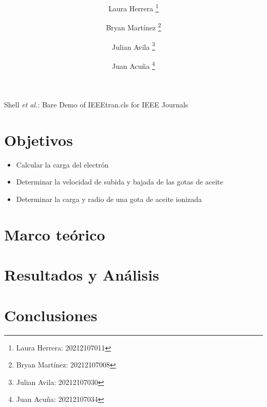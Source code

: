 \documentclass[journal, table]{IEEEtran}
\begin{document}
\title{\textbf{} \\
    \small{}}

\author[*]{Laura Herrera
    \thanks{Laura Herrera: 20212107011}}
\author[*]{Bryan Martínez
    \thanks{Bryan Martínez: 20212107008}}
\author[*]{Julian Avila
    \thanks{Julian Avila: 20212107030}}
\author[*]{Juan Acuña
    \thanks{Juan Acuña: 20212107034}}



\markboth{}
{Shell \MakeLowercase{\textit{et al.}}: Bare Demo of IEEEtran.cls for IEEE Journals}

\maketitle

\begin{abstract}

\end{abstract}

\begin{IEEEkeywords}

\end{IEEEkeywords}

\begin{abstract}

\end{abstract}

\begin{IEEEkeywords}

\end{IEEEkeywords}

\section{Objetivos}
\begin{itemize}
    \item Calcular la carga del electrón
    \item Determinar la velocidad de subida y bajada de las gotas de aceite
    \item Determinar la carga y radio de una gota de aceite ionizada
\end{itemize}

\section{Marco teórico}


\section{Resultados y Análisis}


\section{Conclusiones}

\printbibliography
\end{document}
